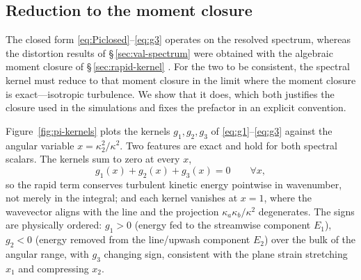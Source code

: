 \documentclass[lineno]{JFM-FLM_Au}
\begin{document}
\subsection{Reduction to the moment closure}\label{sec:lrr-reduction}

The closed form \eqref{eq:Piclosed}--\eqref{eq:g3} operates on the resolved
spectrum, whereas the distortion results of \S\,\ref{sec:val-spectrum} were
obtained with the algebraic moment closure of \S\,\ref{sec:rapid-kernel}
\citep{LaunderReeceRodi1975}. For the two to be consistent, the spectral
kernel must reduce to that moment closure in the limit where the moment
closure is exact---isotropic turbulence. We show that it does, which both
justifies the closure used in the simulations and fixes the prefactor in an
explicit convention.

Figure~\ref{fig:pi-kernels} plots the kernels $g_1,g_2,g_3$ of
\eqref{eq:g1}--\eqref{eq:g3} against the angular variable
$x=\kappa_2^2/\kappa^2$. Two features are exact and hold for both spectral
scalars. The kernels sum to zero at every $x$,
\begin{equation}
  g_1(x)+g_2(x)+g_3(x)=0 \qquad \forall x,
  \label{eq:gtrace}
\end{equation}
so the rapid term conserves turbulent kinetic energy pointwise in wavenumber,
not merely in the integral; and each kernel vanishes at $x=1$, where the
wavevector aligns with the line and the projection $\kappa_a\kappa_b/\kappa^2$
degenerates. The signs are physically ordered: $g_1>0$ (energy fed to the
streamwise component $E_1$), $g_2<0$ (energy removed from the line/upwash
component $E_2$) over the bulk of the angular range, with $g_3$ changing sign,
consistent with the plane strain stretching $x_1$ and compressing $x_2$.
\end{document}
